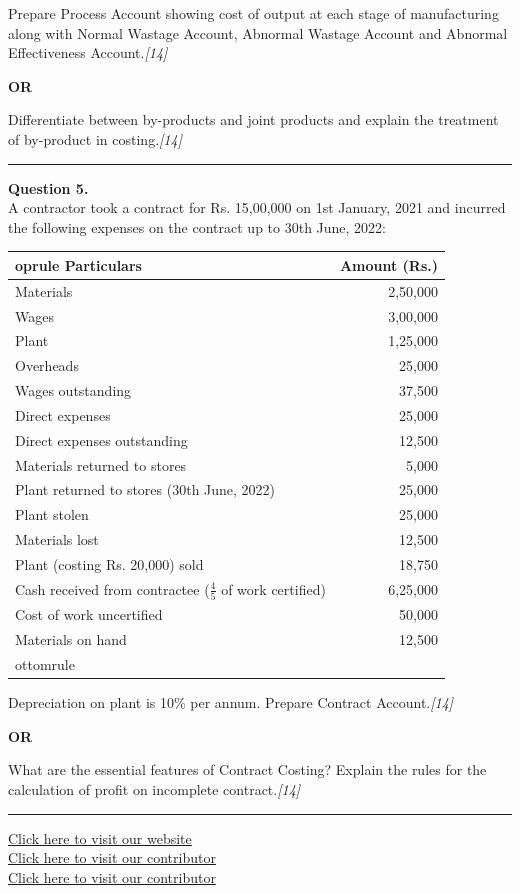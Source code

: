 \documentclass[11pt,a4paper]{article}
\newcommand{\pts}[1]{\hfill   \textit{[#1]}}
\begin{document}
Prepare Process Account showing cost of output at each stage of manufacturing along with Normal Wastage Account, Abnormal Wastage Account and Abnormal Effectiveness Account.\pts{14}

\centerline{   \textbf{OR}}

Differentiate between by-products and joint products and explain the treatment of by-product in costing.\pts{14}

\medskip\rule{\linewidth}{0.2pt}




\noindent   \textbf{Question 5.} \\
A contractor took a contract for Rs. 15,00,000 on 1st January, 2021 and incurred the following expenses on the contract up to 30th June, 2022:

\begin{center}
  
\begin{tabular}{lr}
     oprule
   \textbf{Particulars} &   \textbf{Amount (Rs.)} \\
    \midrule
    Materials & 2,50,000 \\
    Wages & 3,00,000 \\
    Plant & 1,25,000 \\
    Overheads & 25,000 \\
    Wages outstanding & 37,500 \\
    Direct expenses & 25,000 \\
    Direct expenses outstanding & 12,500 \\
    Materials returned to stores & 5,000 \\
    Plant returned to stores (30th June, 2022) & 25,000 \\
    Plant stolen & 25,000 \\
    Materials lost & 12,500 \\
    Plant (costing Rs. 20,000) sold & 18,750 \\
    Cash received from contractee ($\frac{4}{5}$ of work certified) & 6,25,000 \\
    Cost of work uncertified & 50,000 \\
    Materials on hand & 12,500 \\
    ottomrule
  \end{tabular}
\end{center}

Depreciation on plant is 10\% per annum. Prepare Contract Account.\pts{14}

\centerline{   \textbf{OR}}

What are the essential features of Contract Costing? Explain the rules for the calculation of profit on incomplete contract.\pts{14}

\vfill
\rule{\linewidth}{0.4pt}

\begin{center}\small
  \href{https://bhu-exam.vercel.app/}{Click here to visit our website}\\[4pt]
  \href{https://me-aryan.vercel.app/}{Click here to visit our contributor}\\[4pt]
  \href{https://quashan-me.vercel.app/}{Click here to visit our contributor}
\end{center}
\end{document}
